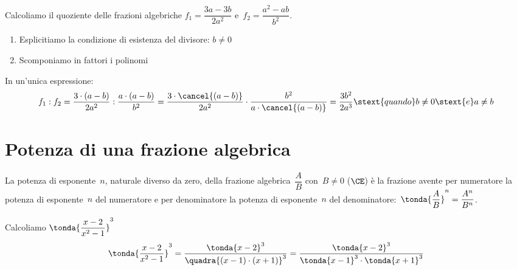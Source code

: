  \begin{esempio}
Calcoliamo il quoziente delle frazioni algebriche
\(f_{1}=\dfrac{3a-3b}{2a^{2}}\) e~\(f_{2}=\dfrac{a^{2}-ab}{b^{2}}\).

\begin{enumerate}
\item Esplicitiamo la condizione di esistenza del divisore: \(b \neq 0\)
\item Scomponiamo in fattori i polinomi
\end{enumerate}
In un'unica espressione:
\[f_1 : f_2 = 
  \dfrac{3\cdot(a-b)}{2a^{2}}:\dfrac{a\cdot(a-b)}{b^2}=
  \dfrac{3\cdot\cancel{(a-b)}}{2a^{2}}\cdot
  \dfrac{b^2}{a\cdot\cancel{(a-b)}}=\dfrac{3b^2}{2a^3} \stext{quando}
  b \neq 0 \stext{e} a \neq b\]
 \end{esempio}


\section{Potenza di una frazione algebrica}
\label{sec:frazalg_potenza}

La potenza di esponente~\(n\), naturale diverso da zero, della frazione 
algebrica~\(\dfrac{A}{B}\) con~\(B{\neq}0\) (\(\CE\)) è la frazione
avente per numeratore la potenza di esponente~\(n\) del numeratore e per 
denominatore la potenza di esponente~\(n\)
del denominatore:~\( \tonda{\dfrac{A}{B}} ^{n}=\dfrac{A^{n}}{B^{n}}\).

 \begin{esempio}
Calcoliamo  \( \tonda{\dfrac{x-2}{x^{2}-1}} ^{3}\)
\[\tonda{\dfrac{x-2}{x^{2}-1}} ^{3} =
\dfrac{\tonda{x-2}^3}{\quadra{(x-1)\cdot(x+1)}^3} = 
  \dfrac{\tonda{x-2}^3}{\tonda{x-1}^3 \cdot \tonda{x+1}^3}\]
 \end{esempio}

